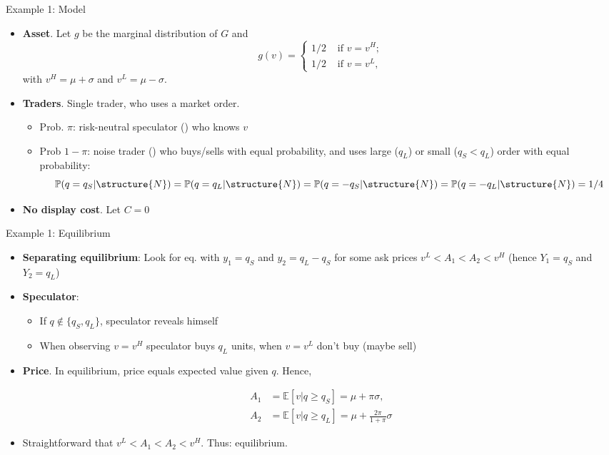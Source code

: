 \documentclass[english,10pt
,aspectratio=169
]{beamer}
\begin{document}
\begin{frame}{Example 1: Model} 
	\begin{itemize}
		\item \textbf{Asset}. Let $g$ be the marginal distribution of $G$ and
		\[
		g(v)=\left\{ \begin{aligned}
		1/2  & \text{ if } v=v^H; \\
		1/2 & \text{ if } v=v^L,
		\end{aligned}
		\right.
		\]
		with $v^{H}=\mu + \sigma $ and $v^{L}= \mu - \sigma $.
		\item \textbf{Traders}. Single trader, who uses a market order.
		\begin{itemize}
			\item Prob. $\pi$: risk-neutral speculator () who knows $v$
			\item Prob $1-\pi$: noise trader ()  who buys/sells with equal probability, and uses large ($q_L$) or small ($q_S<q_L$) order with equal probability:
			$$
			\mathbb{P}(q=q_S|\structure{N})= \mathbb{P}(q=q_L|\structure{N})=\mathbb{P}(q=-q_S|\structure{N})=\mathbb{P}(q=-q_L|\structure{N})=1/4
			$$
		\end{itemize}
		\item \textbf{No display cost}. Let $C=0$
	\end{itemize}
\end{frame}


\begin{frame}{Example 1: Equilibrium}
	\begin{itemize}
		\item \textbf{Separating equilibrium}: Look for eq. with $y_{1}=q_{S}$ and $y_{2}=q_{L}-q_{S}$ for some ask prices $v^L<A_1<A_2<v^H$ (hence $Y_1=q_S$ and $Y_2=q_L$)
		\item \textbf{Speculator}: 
		\begin{itemize}
			\item If $q \notin \{q_S,q_L\}$, speculator reveals himself
			\item 
			When observing $v=v^{H}$ speculator buys $q_{L}$ units, when $v=v^L$ don't buy (maybe sell)
		\end{itemize}
		\item \textbf{Price}. In equilibrium, price equals expected value given $q$. Hence,
		\begin{block}{}
			\[\begin{aligned}
			A_1 & =\mathbb{E}[v|q \geq q_{S}] = \mu + \pi \sigma,\\
			A_2 & = \mathbb{E}[v|q \geq q_{L}] = \mu + \frac{2\pi}{1+\pi} \sigma
			\end{aligned}
			\]
		\end{block}
		\item Straightforward that $v^L<A_1<A_2<v^H$. Thus: equilibrium.
	\end{itemize}
\end{frame}
\end{document}
